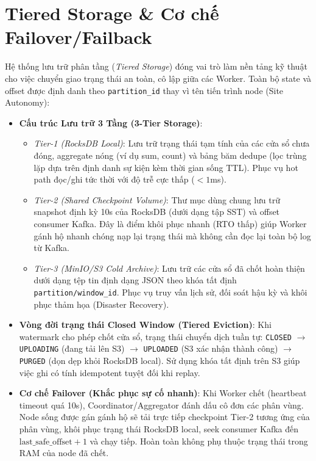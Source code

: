 \documentclass[9pt,a4paper]{article}
\begin{document}
\section{Tiered Storage \& Cơ chế Failover/Failback}
Hệ thống lưu trữ phân tầng (\emph{Tiered Storage}) đóng vai trò làm nền tảng kỹ thuật cho việc chuyển giao trạng thái an toàn, cô lập giữa các Worker. Toàn bộ state và offset được định danh theo \texttt{partition\_id} thay vì tên tiến trình node (Site Autonomy):

\begin{itemize}[leftmargin=*]
    \item \textbf{Cấu trúc Lưu trữ 3 Tầng (3-Tier Storage)}:
    \begin{itemize}[leftmargin=*,nosep]
        \item \emph{Tier-1 (RocksDB Local)}: Lưu trữ trạng thái tạm tính của các cửa sổ chưa đóng, aggregate nóng (ví dụ sum, count) và bảng băm dedupe (lọc trùng lặp dựa trên định danh sự kiện kèm thời gian sống TTL). Phục vụ hot path đọc/ghi tức thời với độ trễ cực thấp ($<1$ms).
        \item \emph{Tier-2 (Shared Checkpoint Volume)}: Thư mục dùng chung lưu trữ snapshot định kỳ 10s của RocksDB (dưới dạng tập SST) và offset consumer Kafka. Đây là điểm khôi phục nhanh (RTO thấp) giúp Worker gánh hộ nhanh chóng nạp lại trạng thái mà không cần đọc lại toàn bộ log từ Kafka.
        \item \emph{Tier-3 (MinIO/S3 Cold Archive)}: Lưu trữ các cửa sổ đã chốt hoàn thiện dưới dạng tệp tin định dạng JSON theo khóa tất định \texttt{partition/window\_id}. Phục vụ truy vấn lịch sử, đối soát hậu kỳ và khôi phục thảm họa (Disaster Recovery).
    \end{itemize}
    \item \textbf{Vòng đời trạng thái Closed Window (Tiered Eviction)}: Khi watermark cho phép chốt cửa sổ, trạng thái chuyển dịch tuần tự: \texttt{CLOSED} $\to$ \texttt{UPLOADING} (đang tải lên S3) $\to$ \texttt{UPLOADED} (S3 xác nhận thành công) $\to$ \texttt{PURGED} (dọn dẹp khỏi RocksDB local). Sử dụng khóa tất định trên S3 giúp việc ghi có tính idempotent tuyệt đối khi replay.
    \item \textbf{Cơ chế Failover (Khắc phục sự cố nhanh)}: Khi Worker chết (heartbeat timeout quá 10s), Coordinator/Aggregator đánh dấu cô đơn các phân vùng. Node sống được gán gánh hộ sẽ tải trực tiếp checkpoint Tier-2 tương ứng của phân vùng, khôi phục trạng thái RocksDB local, seek consumer Kafka đến $\text{last\_safe\_offset} + 1$ và chạy tiếp. Hoàn toàn không phụ thuộc trạng thái trong RAM của node đã chết.

\end{itemize}
\end{document}
